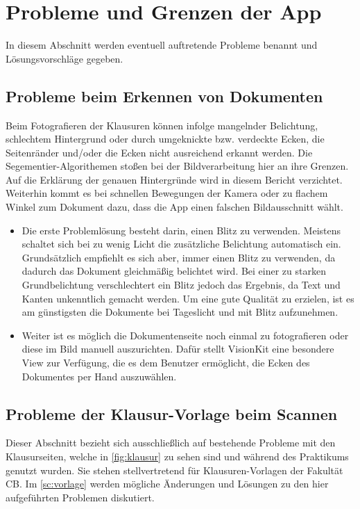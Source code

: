 \documentclass[notables, nomenclature, oneside, 150]{HSMW-Thesis}
\begin{document}
	\section{Probleme und Grenzen der App}\label{sc:grenzen}
		In diesem Abschnitt werden eventuell auftretende Probleme benannt und Lösungsvorschläge gegeben.

		\subsection{Probleme beim Erkennen von Dokumenten}\label{ssc:erkennen}
			Beim Fotografieren der Klausuren können infolge mangelnder Belichtung, schlechtem Hintergrund oder durch umgeknickte bzw. verdeckte Ecken, die Seitenränder und/oder die Ecken nicht ausreichend erkannt werden. Die Segementier-Algorithemen stoßen bei der Bildverarbeitung hier an ihre Grenzen. Auf die Erklärung der genauen Hintergründe wird in diesem Bericht verzichtet. Weiterhin kommt es bei schnellen Bewegungen der Kamera oder zu flachem Winkel zum Dokument dazu, dass die App einen falschen Bildausschnitt wählt.
			\vspace{-5mm}
			\begin{itemize}
				\item Die erste Problemlösung besteht darin, einen Blitz zu verwenden. Meistens schaltet sich bei zu wenig Licht die zusätzliche Belichtung automatisch ein. Grundsätzlich empfiehlt es sich aber, immer einen Blitz zu verwenden, da dadurch das Dokument gleichmäßig belichtet wird. Bei einer zu starken Grundbelichtung verschlechtert ein Blitz jedoch das Ergebnis, da Text und Kanten unkenntlich gemacht werden. Um eine gute Qualität zu erzielen, ist es am günstigsten die Dokumente bei Tageslicht und mit Blitz aufzunehmen. 
				\item Weiter ist es möglich die Dokumentenseite noch einmal zu fotografieren oder diese im Bild manuell auszurichten. Dafür stellt VisionKit eine besondere View zur Verfügung, die es dem Benutzer ermöglicht, die Ecken des Dokumentes per Hand auszuwählen.
			\end{itemize}
		
		\subsection{Probleme der Klausur-Vorlage beim Scannen}\label{ssc:problemevorlage}
			Dieser Abschnitt bezieht sich ausschließlich auf bestehende Probleme mit den Klausurseiten, welche in \autoref{fig:klausur} zu sehen sind und während des Praktikums genutzt wurden. Sie stehen stellvertretend für Klausuren-Vorlagen der Fakultät CB. Im \autoref{sc:vorlage} werden mögliche Änderungen und Lösungen zu den hier aufgeführten Problemen diskutiert.
		
\end{document}
